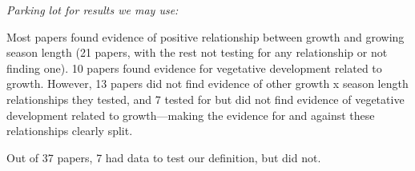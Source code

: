 \documentclass[11pt]{article}
\begin{document}
\renewcommand{\refname}{\CHead{}}

\emph{Parking lot for results we may use:}


Most papers found evidence of positive relationship between growth and growing season length (21 papers, with the rest not testing for any relationship or not finding one). 10 papers found evidence for vegetative development related to growth. However, 13 papers did not find evidence of other growth x season length relationships they tested, and 7 tested for but did not find evidence of vegetative development related to growth---making the evidence for and against these relationships clearly split.

Out of 37 papers, 7 had data to test our definition, but did not. 
\end{document}
